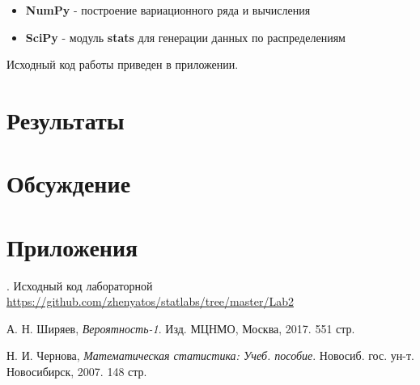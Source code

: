 \documentclass[12pt,a4paper]{article}
\begin{document}
\begin{itemize}
	\item \textbf{NumPy} - построение вариационного ряда и вычисления
	\item \textbf{SciPy} - модуль \textbf{stats} для генерации данных по распределениям
\end{itemize}

Исходный код работы приведен в приложении. 
\pagebreak

\section{Результаты}

\pagebreak

\section{Обсуждение}

\pagebreak

\section{Приложения}
. Исходный код лабораторной {\url{https://github.com/zhenyatos/statlabs/tree/master/Lab2}}

\begin{thebibliography}{9} 
	 А. Н. Ширяев, \emph{Вероятность-1}. Изд. МЦНМО, Москва, 2017. 551 стр. 
	
	 Н. И. Чернова, \emph{Математическая статистика: Учеб. пособие}. Новосиб. гос. ун-т. Новосибирск, 2007. 148 стр.
\end{thebibliography}
\end{document}

